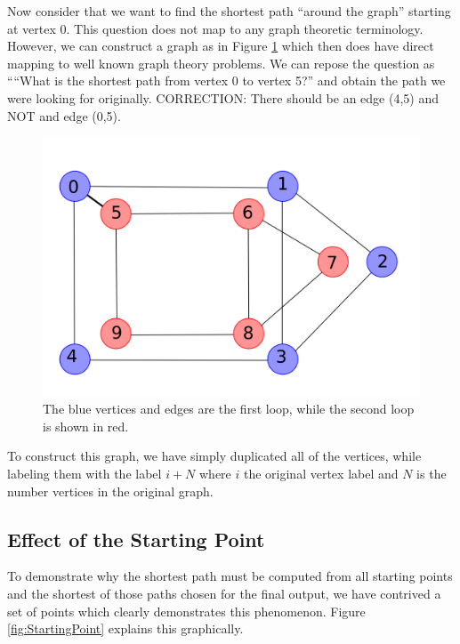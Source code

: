\documentclass{InsightArticle}
\begin{document}
\begin{enumerate}
Now consider that we want to find the shortest path ``around the graph'' starting at vertex 0. This question does not map to any graph theoretic terminology. However, we can construct a graph as in Figure \ref{fig:TwoLoops2} which then does have direct mapping to well known graph theory problems. We can repose the question as ````What is the shortest path from vertex 0 to vertex 5?'' and obtain the path we were looking for originally. CORRECTION: There should be an edge (4,5) and NOT and edge (0,5).
\begin{figure}[H]
  \centering
  \includegraphics[width=0.3\linewidth]{images/TwoLoops2}
  \caption{The blue vertices and edges are the first loop, while the second loop is shown in red.}
  \label{fig:TwoLoops2}
\end{figure}

To construct this graph, we have simply duplicated all of the vertices, while labeling them with the label $i+N$ where $i$ the original vertex label and $N$ is the number vertices in the original graph.

\subsection{Effect of the Starting Point}
\label{sec:Algorithm:StartingPoint}
To demonstrate why the shortest path must be computed from all starting points and the shortest of those paths chosen for the final output, we have contrived a set of points which clearly demonstrates this phenomenon. Figure \ref{fig:StartingPoint} explains this graphically.


\end{enumerate}
\end{document}
